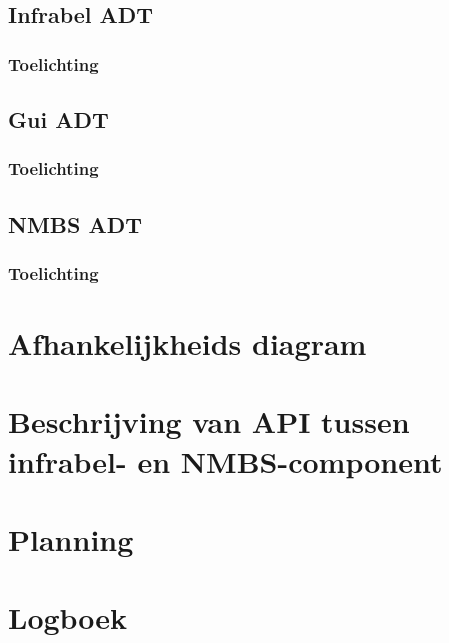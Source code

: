 \documentclass{article}
\begin{document}
\subsection{Infrabel ADT}
\subsubsection{Toelichting}
\subsection{Gui ADT}
\subsubsection{Toelichting}
\subsection{NMBS ADT}
\subsubsection{Toelichting}
\section{Afhankelijkheids diagram}
\section{Beschrijving van API tussen infrabel- en NMBS-component}
\section{Planning}
\section{Logboek}
\end{document}
